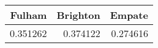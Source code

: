 \begin{tabular}{rrr}
\hline
   Fulham &   Brighton &   Empate \\
\hline
 0.351262 &   0.374122 & 0.274616 \\
\hline
\end{tabular}